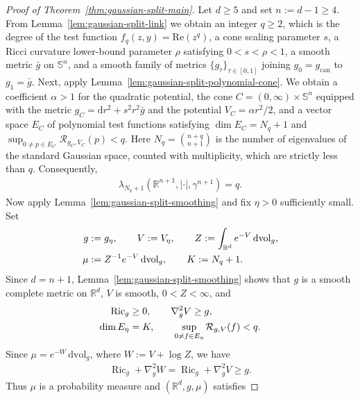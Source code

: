 \documentclass[11pt,reqno]{amsart}
\numberwithin{equation}{section}
\theoremstyle{definition}
\theoremstyle{remark}
\def\cR {\mathcal{R}}
\newcommand{\lam}{\lambda}
\newcommand{\ta}{\tau}
\renewcommand\Re{\mathrm{Re}\,}
\renewcommand{\Re}{\mathrm{Re}}
\newcommand{\ud}{\mathrm{d}}
\newcommand{\0}{\emptyset}
\newcommand{\bbR}{\mathbb R}
\newcommand{\bbS}{\mathbb S}
\newcommand{\Ric}{\operatorname{Ric}}
\newcommand{\can}{\mathrm{can}}
\newcommand{\dvol}{\,\mathrm{dvol}}
\begin{document}
\begin{proof}[Proof of Theorem~\ref{thm:gaussian-split-main}]
Let $d\geq5$ and set $n:=d-1\geq4$. From Lemma~\ref{lem:gaussian-split-link} we obtain an integer $q\geq2$, which is the degree of the test function $f_q(z,y)=\Re(z^q)$, a cone scaling
parameter $s$, a Ricci curvature lower-bound parameter $\rho$ satisfying $0<s<\rho<1$, a smooth metric $\bar g$ on $\bbS^n$, and
a smooth family of metrics $\{g_\ta\}_{\ta\in[0,1]}$ joining $g_0=g_\can$ to $g_1=\bar g$. Next, apply Lemma~\ref{lem:gaussian-split-polynomial-cone}. We obtain a coefficient $\alpha>1$ for the quadratic potential, the cone $C=(0,\infty)\times\bbS^n$ equipped with the metric $g_C=\ud r^2+s^2r^2\bar g$ and the potential $V_C=\alpha r^2/2$, and a
vector space $E_C$ of polynomial test functions satisfying $\dim E_C=N_q+1$ and
$\sup_{0\neq p\in E_C}\cR_{g_C,V_C}(p)<q$. Here
$N_q=\binom{n+q}{n+1}$ is the number of eigenvalues of the standard Gaussian space, counted with multiplicity, which are strictly less than $q$.
Consequently,
\begin{align}\label{eq:gaussian-split-final-Gaussian-index}
        \lam_{N_q+1}
        (\bbR^{n+1},|\cdot|,\gamma^{n+1})
        =
        q.
\end{align}
Now apply Lemma~\ref{lem:gaussian-split-smoothing} and fix $\eta>0$ sufficiently
small. Set
\begin{align}
        g
        &:=
        g_\eta,
        \qquad
        V
        :=
        V_\eta,
        \qquad
        Z
        :=
        \int_{\bbR^d}e^{-V}\dvol_g,
        \notag\\
        \mu
        &:=
        Z^{-1}e^{-V}\dvol_g,
        \qquad
        K
        :=
        N_q+1.
\end{align}
Since $d=n+1$, Lemma~\ref{lem:gaussian-split-smoothing} shows that $g$ is a
smooth complete metric on $\bbR^d$, $V$ is smooth, $0<Z<\infty$, and
\begin{align}
        \Ric_g
        &\geq
        0,
        \qquad
        \nabla_g^2V
        \geq
        g,
        \notag\\
        \dim E_\eta
        &=
        K,
        \qquad
        \sup_{0\neq f\in E_\eta}
        \cR_{g,V}(f)
        <
        q.
\end{align}
Since $\mu=e^{-W}\dvol_g$, where $W:=V+\log Z$, we have
\begin{align}
        \Ric_g+\nabla_g^2W
        =
        \Ric_g+\nabla_g^2V
        \geq
        g.
\end{align}
Thus $\mu$ is a probability measure and $(\bbR^d,g,\mu)$ satisfies

\end{proof}
\end{document}
